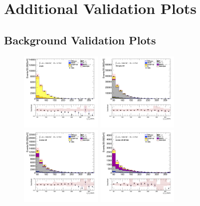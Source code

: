 \chapter{Additional Validation Plots}\label{app:valid-plots}

	\clearpage
	\section{\taujets Background Validation Plots}\label{sec:taujet-valid-plots}

		\begin{figure}[!htp]
			\begin{center}    
			\includegraphics[width=0.35\textwidth]{chapters/chapter6_HPlus/images/taujets/tau_0_pt_TTBAR.png}
			\includegraphics[width=0.35\textwidth]{chapters/chapter6_HPlus/images/taujets/tau_0_pt_WJETS.png} \\
			\includegraphics[width=0.35\textwidth]{chapters/chapter6_HPlus/images/taujets/tau_0_pt_BVETO.png}
			\includegraphics[width=0.35\textwidth]{chapters/chapter6_HPlus/images/taujets/tau_0_pt_BVETO_MT100.png} \\

\end{center}
\end{figure}

